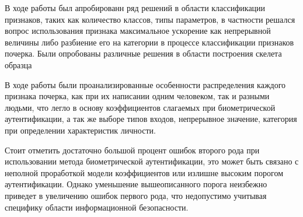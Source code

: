 В ходе работы был апробированн ряд решений в области классификации признаков, таких как количество классов, типы параметров, в частности решался вопрос использования признака максимальное ускорение как непрерывной величины либо разбиение его на категории в процессе классификации признаков почерка. Были опробованы различные решения в области построения скелета образца  

В ходе работы были проанализированные особенности распределения каждого признака почерка, как при их написании одним человеком, так и разными людьми, что легло в основу коэффициентов слагаемых при биометрической аутентификации, а так же выборе типов входов, непрерывное значение, категория при определении характеристик личности. 

Стоит отметить достаточно большой процент ошибок второго рода при использовании метода биометрической аутентификации, это может быть связано с неполной проработкой модели коэффициентов или излишне высоким порогом аутентификации. Однако уменьшение вышеописанного порога неизбежно приведет в увеличению ошибок первого рода, что недопустимо учитывая специфику области информационной безопасности.

\newcommand{\tableHead}{\hline Тип признака & Название признака & Отклонение от обучающей выборки \\ \hline}

